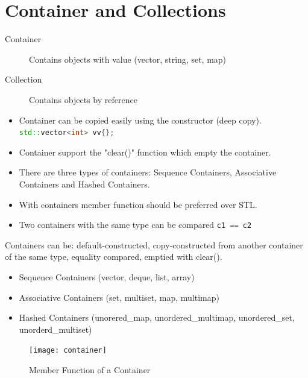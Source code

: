 \section{Container and Collections}
\begin{description}
  \item[Container] Contains objects with value (vector, string, set, map)
  \item[Collection] Contains objects by reference
\end{description}

\begin{itemize}
  \itemsep -0.5em 
  \item Container can be copied easily using the constructor (deep copy). \lstinline[language=C++]|std::vector<int> vv{};|
  \item Container support the "clear()" function which empty the container.
  \item There are three types of containers: Sequence Containers, Associative Containers and Hashed Containers.
  \item With containers member function should be preferred over STL.
  \item Two containers with the same type can be compared \lstinline[language=C++]|c1 == c2|
\end{itemize}

Containers can be: default-constructed, copy-constructed from another container of the same type, equality compared, emptied with clear().
\begin{itemize}
	\itemsep -0.5em
	\item Sequence Containers (vector, deque, list, array)
	\item Associative Containers (set, multiset, map, multimap)
	\item Hashed Containers (unorered\_map, unordered\_multimap, unordered\_set, unorderd\_multiset)
\end{itemize}

\begin{figure}[h!]
  \centering
  \texttt{[image: container]}
  \caption{Member Function of a Container}
\end{figure}

